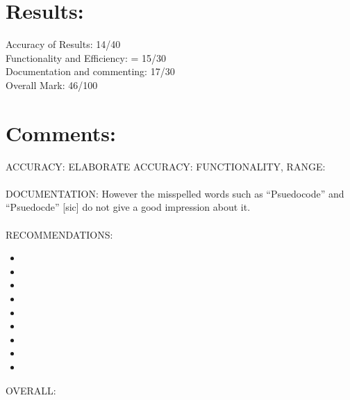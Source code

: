 \documentclass[11pt]{article} %
\begin{document}

\section{Results:}

Accuracy of Results: 14/40 \\
Functionality and Efficiency: = 15/30 \\ 
Documentation and commenting: 17/30 \\ 
Overall Mark: 46/100 \\

\section{Comments:}

ACCURACY:
ELABORATE ACCURACY:
FUNCTIONALITY, RANGE:
\\
\\ 
DOCUMENTATION:
However the misspelled words such as ``Psuedocode'' and ``Psuedocde'' [sic] do not give a good impression about it. \\
\\
RECOMMENDATIONS:
\begin{itemize}
\item {}
\item {}
\item {}
\item {}
\item {}
\item {}
\item {}
\item {}
\item {}
\end{itemize}
OVERALL: 
\end{document}
